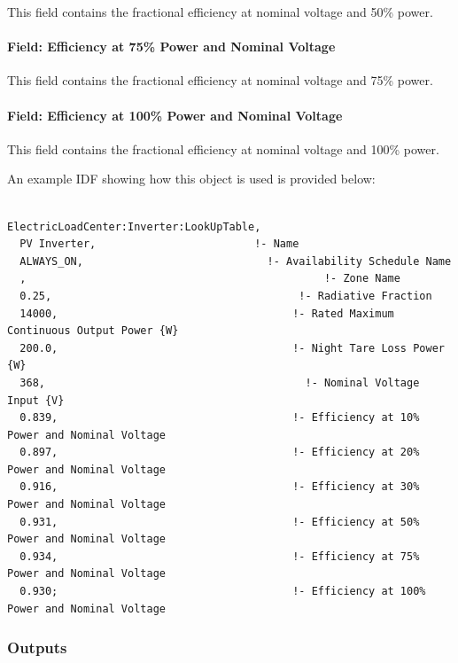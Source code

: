 This field contains the fractional efficiency at nominal voltage and 50\% power.

\paragraph{Field: Efficiency at 75\% Power and Nominal Voltage}\label{field-efficiency-at-75-power-and-nominal-voltage}

This field contains the fractional efficiency at nominal voltage and 75\% power.

\paragraph{Field: Efficiency at 100\% Power and Nominal Voltage}\label{field-efficiency-at-100-power-and-nominal-voltage}

This field contains the fractional efficiency at nominal voltage and 100\% power.

An example IDF showing how this object is used is provided below:

\begin{lstlisting}

ElectricLoadCenter:Inverter:LookUpTable,
  PV Inverter,                         !- Name
  ALWAYS_ON,                             !- Availability Schedule Name
  ,                                               !- Zone Name
  0.25,                                       !- Radiative Fraction
  14000,                                     !- Rated Maximum Continuous Output Power {W}
  200.0,                                     !- Night Tare Loss Power {W}
  368,                                         !- Nominal Voltage Input {V}
  0.839,                                     !- Efficiency at 10% Power and Nominal Voltage
  0.897,                                     !- Efficiency at 20% Power and Nominal Voltage
  0.916,                                     !- Efficiency at 30% Power and Nominal Voltage
  0.931,                                     !- Efficiency at 50% Power and Nominal Voltage
  0.934,                                     !- Efficiency at 75% Power and Nominal Voltage
  0.930;                                     !- Efficiency at 100% Power and Nominal Voltage
\end{lstlisting}

\subsubsection{Outputs}\label{outputs-3-005}

